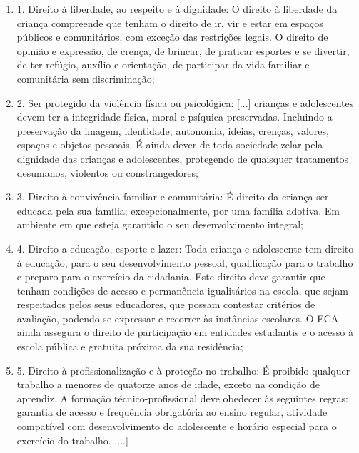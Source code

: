 \begin{itemize}
\begin{itemize}
\begin{itemize}
\begin{itemize}
{\begin{enumerate}
\item 1. Direito à liberdade, ao respeito e à dignidade: O direito à
liberdade da criança compreende que tenham o direito de ir, vir e estar
em espaços públicos e comunitários, com exceção das restrições legais. O
direito de opinião e expressão, de crença, de brincar, de praticar
esportes e se divertir, de ter refúgio, auxílio e orientação, de
participar da vida familiar e comunitária sem discriminação;

\item 2. Ser protegido da violência física ou psicológica: [...] crianças e adolescentes devem ter a integridade física, moral
e psíquica preservadas. Incluindo a preservação da imagem, identidade,
autonomia, ideias, crenças, valores, espaços e objetos pessoais. É ainda
dever de toda sociedade zelar pela dignidade das crianças e
adolescentes, protegendo de quaisquer tratamentos desumanos, violentos
ou constrangedores;

\item 3. Direito à convivência familiar e comunitária: É direito da criança
ser educada pela sua família; excepcionalmente, por uma família adotiva.
Em ambiente em que esteja garantido o seu desenvolvimento integral;

\item 4. Direito a educação, esporte e lazer: Toda criança e adolescente tem
direito à educação, para o seu desenvolvimento pessoal, qualificação
para o trabalho e preparo para o exercício da cidadania. Este direito
deve garantir que tenham condições de acesso e permanência igualitários
na escola, que sejam respeitados pelos seus educadores, que possam
contestar critérios de avaliação, podendo se expressar e recorrer às
instâncias escolares. O ECA ainda assegura o direito de participação em
entidades estudantis e o acesso à escola pública e gratuita próxima da
sua residência;

\item 5. Direito à profissionalização e à proteção no trabalho: É proibido
qualquer trabalho a menores de quatorze anos de idade, exceto na
condição de aprendiz. A formação técnico-profissional deve obedecer às
seguintes regras: garantia de acesso e frequência obrigatória ao ensino
regular, atividade compatível com desenvolvimento do adolescente e
horário especial para o exercício do trabalho. [...]
\end{enumerate}


}
\end{itemize}
\end{itemize}
\end{itemize}
\end{itemize}
